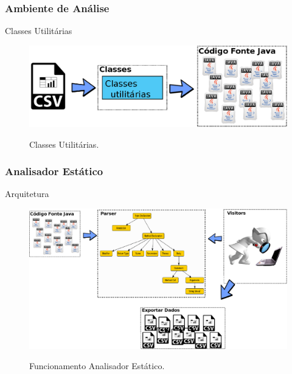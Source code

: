 \documentclass[]{beamer}
\begin{document}
\begin{frame}[label=metodologia, fragile]
	\frametitle{Ambiente de Análise}
	\begin{block}{Classes Utilitárias}
			\begin{figure}[h]
				\center
				\includegraphics[scale=0.50]{../TCC/Imagens/InputArquitetura}
				\label{fig:oportunidadesSwitchString}
				\caption{Classes Utilitárias.}
			\end{figure}
	\end{block}
\end{frame}


\begin{frame}[label=metodologia, fragile]
	\frametitle{Analisador Estático}
	\begin{block}{Arquitetura}
			\begin{figure}[h]
				\center
				\includegraphics[scale=0.30]{../TCC/Imagens/FuncionamentoVisitor}
				\label{fig:oportunidadesSwitchString}
				\caption{Funcionamento Analisador Estático.}
			\end{figure}
	\end{block}
\end{frame}
\end{document}
